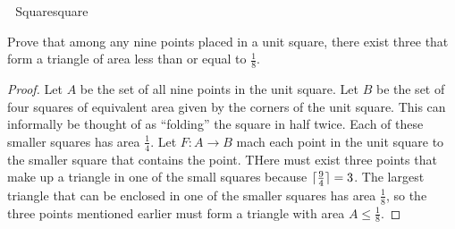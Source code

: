     \begin{example}{\Difficulty\,\Difficulty\,\Difficulty\,\,Square}{square}
    
        Prove that among any nine points placed in a unit square, there exist three that form a triangle of area less than or equal to \(\frac{1}{8}\).
        \begin{proof}
            Let \(A\) be the set of all nine points in the unit square. Let \(B\) be the set of four squares of equivalent area given by the corners of the unit square. This can informally be thought of as ``folding'' the square in half twice. Each of these smaller squares has area \(\frac{1}{4}\). Let \(F:A\to B\) mach each point in the unit square to the smaller square that contains the point. THere must exist three points that make up a triangle in one of the small squares because \(\lceil\frac{9}{4}\rceil=3\). The largest triangle that can be enclosed in one of the smaller squares has area \(\frac{1}{8}\), so the three points mentioned earlier must form a triangle with area \(A\leq\frac{1}{8}\).
        \end{proof}
    
    \end{example}
